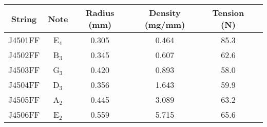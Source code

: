 \begin{tabular}{cccccc}
\toprule
String & Note & Radius (mm) & Density (mg/mm) & Tension (N) \\
\midrule
J4501FF & E$_{4}$ & 0.305 & 0.464 & 85.3 \\
J4502FF & B$_{3}$ & 0.345 & 0.607 & 62.6 \\
J4503FF & G$_{3}$ & 0.420 & 0.893 & 58.0 \\
J4504FF & D$_{3}$ & 0.356 & 1.643 & 59.9 \\
J4505FF & A$_{2}$ & 0.445 & 3.089 & 63.2 \\
J4506FF & E$_{2}$ & 0.559 & 5.715 & 65.6 \\
\bottomrule
\end{tabular}

